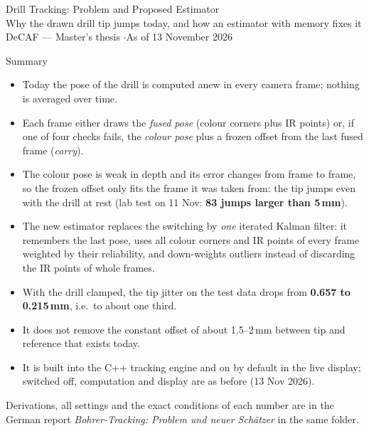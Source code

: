 \documentclass[11pt,a4paper,fleqn]{article}
\begin{document}
\begin{center}
  {\LARGE Drill Tracking: Problem and Proposed Estimator}\\[2mm]
  {\large Why the drawn drill tip jumps today, and how an estimator with memory fixes it}\\[2mm]
  {\small DeCAF --- Master's thesis \quad$\cdot$\quad As of 13 November 2026}
\end{center}

\begin{mybox}{Summary}
\begin{itemize}[leftmargin=*, itemsep=1pt, topsep=0pt]
  \item Today the pose of the drill is computed anew in every camera frame; nothing is averaged over time.
  \item Each frame either draws the \emph{fused pose} (colour corners plus IR points) or, if one of four checks
        fails, the \emph{colour pose} plus a frozen offset from the last fused frame (\emph{carry}).
  \item The colour pose is weak in depth and its error changes from frame to frame, so the frozen offset only fits
        the frame it was taken from: the tip jumps even with the drill at rest (lab test on 11 Nov: \textbf{83 jumps
        larger than 5\,mm}).
  \item The new estimator replaces the switching by \emph{one} iterated Kalman filter: it remembers the last pose,
        uses all colour corners and IR points of every frame weighted by their reliability, and down-weights
        outliers instead of discarding the IR points of whole frames.
  \item With the drill clamped, the tip jitter on the test data drops from \textbf{0.657 to 0.215\,mm}, i.e.\ to
        about one third.
  \item It does not remove the constant offset of about 1.5--2\,mm between tip and reference that exists today.
  \item It is built into the C++ tracking engine and on by default in the live display; switched off,
        computation and display are as before (13 Nov 2026).
\end{itemize}
\end{mybox}

Derivations, all settings and the exact conditions of each number are in the German report
\emph{Bohrer-Tracking: Problem und neuer Schätzer} in the same folder.

\end{document}
